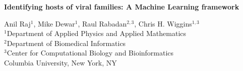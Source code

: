 \documentclass[11pt,amsmath,amssymb,amstex]{article}
\begin{document}
\begin{center}
\pagestyle{empty}
\textbf{Identifying hosts of viral families: A Machine Learning framework}

\small{
Anil Raj$^{1}$, Mike Dewar$^{1}$, Raul Rabadan$^{2,3}$, Chris H. Wiggins$^{1,3}$\\
$^{1}$Department of Applied Physics and Applied Mathematics\\
$^{2}$Department of Biomedical Informatics\\
$^{3}$Center for Computational Biology and Bioinformatics\\
Columbia University, New York, NY\\
}
\end{center}



%
%
\end{document}
